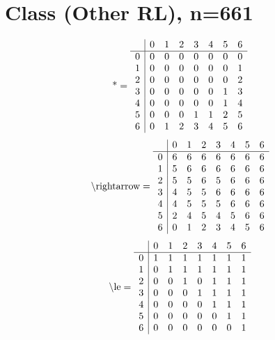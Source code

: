 \documentclass[11pt]{article}
\begin{document}
\section{Class (Other RL), n=661}
\[\text{*} = 
\begin{array}{r | r r r r r r r}
 & 0 & 1 & 2 & 3 & 4 & 5 & 6 \\ \hline
0 & 0 & 0 & 0 & 0 & 0 & 0 & 0 \\
1 & 0 & 0 & 0 & 0 & 0 & 0 & 1 \\
2 & 0 & 0 & 0 & 0 & 0 & 0 & 2 \\
3 & 0 & 0 & 0 & 0 & 0 & 1 & 3 \\
4 & 0 & 0 & 0 & 0 & 0 & 1 & 4 \\
5 & 0 & 0 & 0 & 1 & 1 & 2 & 5 \\
6 & 0 & 1 & 2 & 3 & 4 & 5 & 6 \\
\end{array}
\]
\[\text{\textbackslash rightarrow} = 
\begin{array}{r | r r r r r r r}
 & 0 & 1 & 2 & 3 & 4 & 5 & 6 \\ \hline
0 & 6 & 6 & 6 & 6 & 6 & 6 & 6 \\
1 & 5 & 6 & 6 & 6 & 6 & 6 & 6 \\
2 & 5 & 5 & 6 & 5 & 6 & 6 & 6 \\
3 & 4 & 5 & 5 & 6 & 6 & 6 & 6 \\
4 & 4 & 5 & 5 & 5 & 6 & 6 & 6 \\
5 & 2 & 4 & 5 & 4 & 5 & 6 & 6 \\
6 & 0 & 1 & 2 & 3 & 4 & 5 & 6 \\
\end{array}
\]
\[\text{\textbackslash le} = 
\begin{array}{r | r r r r r r r}
 & 0 & 1 & 2 & 3 & 4 & 5 & 6 \\ \hline
0 & 1 & 1 & 1 & 1 & 1 & 1 & 1 \\
1 & 0 & 1 & 1 & 1 & 1 & 1 & 1 \\
2 & 0 & 0 & 1 & 0 & 1 & 1 & 1 \\
3 & 0 & 0 & 0 & 1 & 1 & 1 & 1 \\
4 & 0 & 0 & 0 & 0 & 1 & 1 & 1 \\
5 & 0 & 0 & 0 & 0 & 0 & 1 & 1 \\
6 & 0 & 0 & 0 & 0 & 0 & 0 & 1 \\
\end{array}
\]
\end{document}
